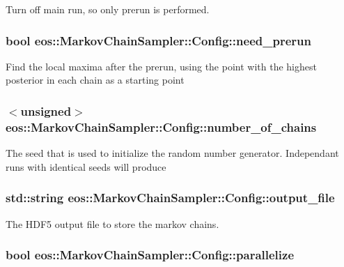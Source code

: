 Turn off main run, so only prerun is performed. \hypertarget{classeos_1_1MarkovChainSampler_1_1Config_acd202b210ff8f364eda6aacdd8958f8a}{
\subsubsection[{need\_\-prerun}]{\setlength{\rightskip}{0pt plus 5cm}bool {\bf eos::MarkovChainSampler::Config::need\_\-prerun}}}
\label{classeos_1_1MarkovChainSampler_1_1Config_acd202b210ff8f364eda6aacdd8958f8a}
Find the local maxima after the prerun, using the point with the highest posterior in each chain as a starting point \hypertarget{classeos_1_1MarkovChainSampler_1_1Config_a802b6d235de40517746b7fc4147d8c7b}{
\subsubsection[{number\_\-of\_\-chains}]{$<$unsigned$>$ {\bf eos::MarkovChainSampler::Config::number\_\-of\_\-chains}}}
\label{classeos_1_1MarkovChainSampler_1_1Config_a802b6d235de40517746b7fc4147d8c7b}
The seed that is used to initialize the random number generator. Independant runs with identical seeds will produce \hypertarget{classeos_1_1MarkovChainSampler_1_1Config_a09fb2c6eeddd6bdde3ac5de54f63433f}{
\subsubsection[{output\_\-file}]{\setlength{\rightskip}{0pt plus 5cm}std::string {\bf eos::MarkovChainSampler::Config::output\_\-file}}}
\label{classeos_1_1MarkovChainSampler_1_1Config_a09fb2c6eeddd6bdde3ac5de54f63433f}
The HDF5 output file to store the markov chains. \hypertarget{classeos_1_1MarkovChainSampler_1_1Config_ad66eb9a48dd6aa736cf476322ed5b13e}{
\subsubsection[{parallelize}]{\setlength{\rightskip}{0pt plus 5cm}bool {\bf eos::MarkovChainSampler::Config::parallelize}}}
